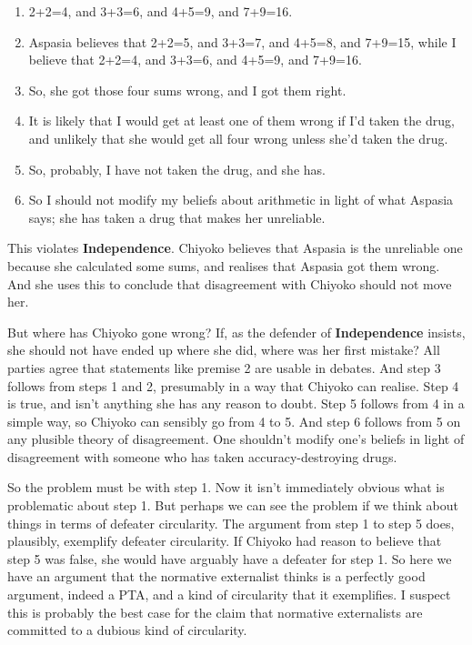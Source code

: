 \begin{enumerate}
\item{} 2+2=4, and 3+3=6, and 4+5=9, and 7+9=16.

\item{} \gls{Aspasia} believes that 2+2=5, and 3+3=7, and 4+5=8, and 7+9=15, while I believe that 2+2=4, and 3+3=6, and 4+5=9, and 7+9=16.

\item{} So, she got those four sums wrong, and I got them right.

\item{} It is likely that I would get at least one of them wrong if I'd taken the drug, and unlikely that she would get all four wrong unless she'd taken the drug.

\item{} So, probably, I have not taken the drug, and she has.

\item{} So I should not modify my beliefs about arithmetic in light of what \gls{Aspasia} says; she has taken a drug that makes her unreliable.

\end{enumerate}
This violates \textbf{Independence}. \gls{Chiyoko} believes that \gls{Aspasia} is the unreliable one because she calculated some sums, and realises that \gls{Aspasia} got them wrong. And she uses this to conclude that disagreement with \gls{Chiyoko} should not move her.

But where has \gls{Chiyoko} gone wrong? If, as the defender of \textbf{Independence} insists, she should not have ended up where she did, where was her first mistake? All parties agree that statements like premise 2 are usable in debates. And step 3 follows from steps 1 and 2, presumably in a way that \gls{Chiyoko} can realise. Step 4 is true, and isn't anything she has any reason to doubt. Step 5 follows from 4 in a simple way, so \gls{Chiyoko} can sensibly go from 4 to 5. And step 6 follows from 5 on any plusible theory of disagreement. One shouldn't modify one's beliefs in light of disagreement with someone who has taken accuracy-destroying drugs.

So the problem must be with step 1. Now it isn't immediately obvious what is problematic about step 1. But perhaps we can see the problem if we think about things in terms of defeater circularity. The argument from step 1 to step 5 does, plausibly, exemplify defeater circularity. If \gls{Chiyoko} had reason to believe that step 5 was false, she would have arguably have a defeater for step 1. So here we have an argument that the normative externalist thinks is a perfectly good argument, indeed a PTA, and a kind of circularity that it exemplifies. I suspect this is probably the best case for the claim that normative externalists are committed to a dubious kind of circularity.

